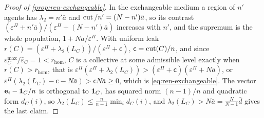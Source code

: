 \begin{proof}[Proof of \cref{prop:ren-exchangeable}]
In the exchangeable medium a region of $n'$ agents has $\lambda_2=n'\bar a$ and $\operatorname{cut}/n'=(N-n')\bar a$, so its contrast $(\varepsilon^\Pi+n'\bar a)/(\varepsilon^\Pi+(N-n')\bar a)$ increases with $n'$, and the supremum is the whole population, $1+N\bar a/\varepsilon^\Pi$. With uniform leak $r(C)=(\varepsilon^\Pi+\lambda_2(L_C))/(\varepsilon^\Pi+\mathsf c)$, $\mathsf c=\operatorname{cut}(C)/n$, and since $\varepsilon^{\max}_C/\bar\varepsilon_C=1<\bar r_{\mathrm{hom}}$, $C$ is a collective at some admissible level exactly when $r(C)>\bar r_{\mathrm{hom}}$, that is $\varepsilon^\Pi(\varepsilon^\Pi+\lambda_2(L_C))>(\varepsilon^\Pi+\mathsf c)(\varepsilon^\Pi+N\bar a)$, or $\varepsilon^\Pi(\lambda_2(L_C)-\mathsf c-N\bar a)>\mathsf cN\bar a\ge0$, which is \eqref{eq:ren-exchangeable}. The vector $\mathbf e_i-\mathbf{1}_C/n$ is orthogonal to $\mathbf{1}_C$, has squared norm $(n-1)/n$ and quadratic form $d_C(i)$, so $\lambda_2(L_C)\le\frac n{n-1}\min_id_C(i)$, and $\lambda_2(L_C)>N\bar a=\frac N{N-1}\bar d$ gives the last claim.
\end{proof}

